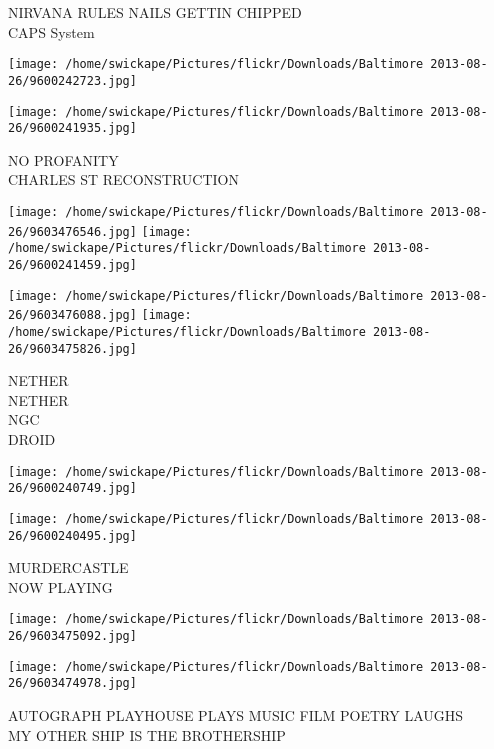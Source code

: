 \documentclass[10pt,letterpaper]{article}
\begin{document}
NIRVANA RULES NAILS GETTIN CHIPPED\\
CAPS System\\
\pagebreak

\texttt{[image: /home/swickape/Pictures/flickr/Downloads/Baltimore 2013-08-26/9600242723.jpg]}

\vspace{0.25in}
\texttt{[image: /home/swickape/Pictures/flickr/Downloads/Baltimore 2013-08-26/9600241935.jpg]}

NO PROFANITY\\
CHARLES ST RECONSTRUCTION\\
\pagebreak

\texttt{[image: /home/swickape/Pictures/flickr/Downloads/Baltimore 2013-08-26/9603476546.jpg]}
\texttt{[image: /home/swickape/Pictures/flickr/Downloads/Baltimore 2013-08-26/9600241459.jpg]}

\texttt{[image: /home/swickape/Pictures/flickr/Downloads/Baltimore 2013-08-26/9603476088.jpg]}
\texttt{[image: /home/swickape/Pictures/flickr/Downloads/Baltimore 2013-08-26/9603475826.jpg]}

NETHER\\
NETHER\\
NGC\\
DROID\\
\pagebreak

\texttt{[image: /home/swickape/Pictures/flickr/Downloads/Baltimore 2013-08-26/9600240749.jpg]}

\vspace{0.25in}
\texttt{[image: /home/swickape/Pictures/flickr/Downloads/Baltimore 2013-08-26/9600240495.jpg]}

MURDERCASTLE\\
NOW PLAYING\\
\pagebreak

\texttt{[image: /home/swickape/Pictures/flickr/Downloads/Baltimore 2013-08-26/9603475092.jpg]}

\vspace{0.25in}
\texttt{[image: /home/swickape/Pictures/flickr/Downloads/Baltimore 2013-08-26/9603474978.jpg]}

AUTOGRAPH PLAYHOUSE PLAYS MUSIC FILM POETRY LAUGHS\\
MY OTHER SHIP IS THE BROTHERSHIP\\
\pagebreak
\end{document}
